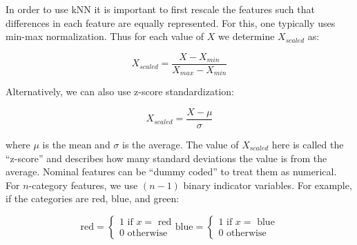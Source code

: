 \documentclass[]{article}
\begin{document}
In order to use kNN it is important to first rescale the features such that differences in each feature are equally represented.  For this, one typically uses min-max normalization.  Thus for each value of $X$ we determine $X_{scaled}$ as:

$$
X_{scaled} = \frac{X-X_{min}}{X_{max}-X_{min}}
$$

Alternatively, we can also use z-score standardization:

$$
X_{scaled} = \frac{X-\mu}{\sigma}
$$

where $\mu$ is the mean and $\sigma$ is the average.  The value of $X_{scaled}$ here is called the ``z-score'' and describes how many standard deviations the value is from the average.
Nominal features can be ``dummy coded'' to treat them as numerical.  For $n$-category features, we use $(n-1)$ binary indicator variables.  For example, if the categories are red, blue, and green:

\begin{equation}
\text{red} =
\begin{cases}
	\text{1 if $x =$ red}\\
	\text{0 otherwise}
\end{cases}       
\text{blue} = 
\begin{cases}
	\text{1 if $x =$ blue}\\
	\text{0 otherwise}
\end{cases}
\end{equation}
\end{document}
